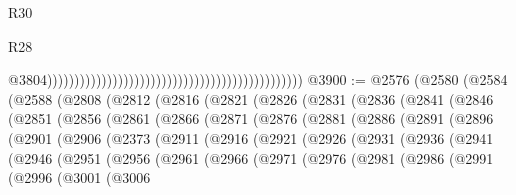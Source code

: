 \begin{lexlean}{R30}
\begin{lexlean}{R28}
\begin{coremodule}
{{{{{{{{{{{{{{{{{{{{{{{{{{{{{{{{{{{{{{{{{{{{{{{{{{{{{{{{{{{{{{{{{{{{{{{{{{{{{{{{{{{{{{{{{{{{{{{{{{{{{{{{{{{{{{{{{{{{{{{{{{{{{{{{{{{{{{{{{{{{{{{                                                                                                  @3804)))))))))))))))))))))))))))))))))))))))))))))))
@3900 := @2576
    (@2580
      (@2584
        (@2588
          (@2808
            (@2812
              (@2816
                (@2821
                  (@2826
                    (@2831
                      (@2836
                        (@2841
                          (@2846
                            (@2851
                              (@2856
                                (@2861
                                  (@2866
                                    (@2871
                                      (@2876
                                        (@2881
                                          (@2886
                                            (@2891
                                              (@2896
                                                (@2901
                                                  (@2906
                                                    (@2373
                                                      (@2911
                                                        (@2916
                                                          (@2921
                                                            (@2926
                                                              (@2931
                                                                (@2936
                                                                  (@2941
                                                                    (@2946
                                                                      (@2951
                                                                        (@2956
                                                                          (@2961
                                                                            (@2966
                                                                              (@2971
                                                                                (@2976
                                                                                  (@2981
                                                                                    (@2986
                                                                                      (@2991
                                                                                        (@2996
                                                                                          (@3001
                                                                                            (@3006
}}}}}}}}}}}}}}}}}}}}}}}}}}}}}}}}}}}}}}}}}}}}}}}}}}}}}}}}}}}}}}}}}}}}}}}}}}}}}}}}}}}}}}}}}}}}}}}}}}}}}}}}}}}}}}}}}}}}}}}}}}}}}}}}}}}}}}}}}}}}}}}
\end{coremodule}
\end{lexlean}
\end{lexlean}
